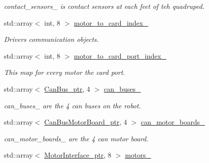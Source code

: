 \begin{DoxyCompactItemize}
\begin{DoxyCompactList}\small\item\em contact\+\_\+sensors\+\_\+ is contact sensors at each feet of teh quadruped. \end{DoxyCompactList}\item 
std\+::array$<$ int, 8 $>$ \hyperlink{classblmc__robots_1_1Solo8TI_a1287fd44d615eec9d3333f186adb18ec}{motor\+\_\+to\+\_\+card\+\_\+index\+\_\+}
\begin{DoxyCompactList}\small\item\em Drivers communication objects. \end{DoxyCompactList}\item 
std\+::array$<$ int, 8 $>$ \hyperlink{classblmc__robots_1_1Solo8TI_ae85c5b55fc3ac22ab6d28533f544fff5}{motor\+\_\+to\+\_\+card\+\_\+port\+\_\+index\+\_\+}\hypertarget{classblmc__robots_1_1Solo8TI_ae85c5b55fc3ac22ab6d28533f544fff5}{}\label{classblmc__robots_1_1Solo8TI_ae85c5b55fc3ac22ab6d28533f544fff5}

\begin{DoxyCompactList}\small\item\em This map for every motor the card port. \end{DoxyCompactList}\item 
std\+::array$<$ \hyperlink{common__header_8hpp_a793c8789a7598e8aaf766939da7262af}{Can\+Bus\+\_\+ptr}, 4 $>$ \hyperlink{classblmc__robots_1_1Solo8TI_a1dc6570d3d386a8f955ca83566dc2f9b}{can\+\_\+buses\+\_\+}\hypertarget{classblmc__robots_1_1Solo8TI_a1dc6570d3d386a8f955ca83566dc2f9b}{}\label{classblmc__robots_1_1Solo8TI_a1dc6570d3d386a8f955ca83566dc2f9b}

\begin{DoxyCompactList}\small\item\em can\+\_\+buses\+\_\+ are the 4 can buses on the robot. \end{DoxyCompactList}\item 
std\+::array$<$ \hyperlink{common__header_8hpp_aab1c6ddb1273247a1b45d5e8b417c216}{Can\+Bus\+Motor\+Board\+\_\+ptr}, 4 $>$ \hyperlink{classblmc__robots_1_1Solo8TI_aa436a497b597b05b0733430ea5c2f251}{can\+\_\+motor\+\_\+boards\+\_\+}\hypertarget{classblmc__robots_1_1Solo8TI_aa436a497b597b05b0733430ea5c2f251}{}\label{classblmc__robots_1_1Solo8TI_aa436a497b597b05b0733430ea5c2f251}

\begin{DoxyCompactList}\small\item\em can\+\_\+motor\+\_\+boards\+\_\+ are the 4 can motor board. \end{DoxyCompactList}\item 
std\+::array$<$ \hyperlink{common__header_8hpp_ae1a0f9992bc8fbbc1943d887f517c180}{Motor\+Interface\+\_\+ptr}, 8 $>$ \hyperlink{classblmc__robots_1_1Solo8TI_a369f7f53f6bb02e325616ebcf9a4fd88}{motors\+\_\+}\hypertarget{classblmc__robots_1_1Solo8TI_a369f7f53f6bb02e325616ebcf9a4fd88}{}\label{classblmc__robots_1_1Solo8TI_a369f7f53f6bb02e325616ebcf9a4fd88}


\end{DoxyCompactItemize}
